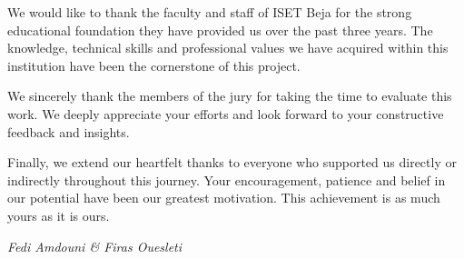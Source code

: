  \hspace*{0.25cm}We would like to thank the faculty and staff of ISET Beja for the strong educational foundation they have provided us over the past three years. The knowledge, technical skills and professional values we have acquired within this institution have been the cornerstone of this project.

\vspace{0.4cm}

  \hspace*{0.25cm}We sincerely thank the members of the jury for taking the time to evaluate this work. We deeply appreciate your efforts and look forward to your constructive feedback and insights.

\vspace{0.4cm}

  \hspace*{0.25cm}Finally, we extend our heartfelt thanks to everyone who supported us directly or indirectly throughout this journey. Your encouragement, patience  and belief in our potential have been our greatest motivation. This achievement is as much yours as it is ours.

\vspace{1cm}
\hfill \textit{Fedi Amdouni \& Firas Ouesleti}